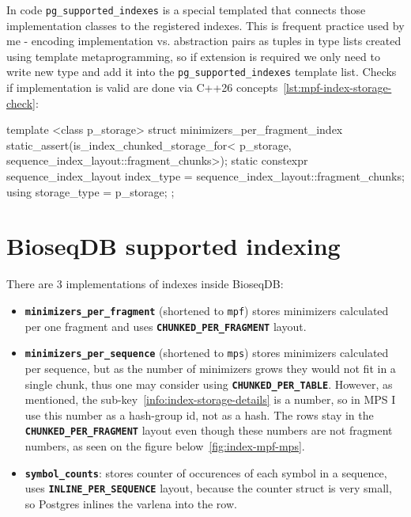 
In code \texttt{pg\_supported\_indexes} is a special templated that connects those implementation classes to the registered indexes. This is frequent practice used by me - encoding 
implementation vs. abstraction pairs as tuples in type lists created using template metaprogramming, so if extension is required we only need to write new type and add it into the 
\texttt{pg\_supported\_indexes} template list. Checks if implementation is valid are done via C++26 concepts~\ref{lst:mpf-index-storage-check}:

\begin{BioseqCppSnippet}[caption={Minimizers per fragment require fragment-chunk storage.},
  label={lst:mpf-index-storage-check}]
template <class p_storage>
struct minimizers_per_fragment_index {
  static_assert(is_index_chunked_storage_for<
      p_storage, sequence_index_layout::fragment_chunks>);
  static constexpr sequence_index_layout index_type =
      sequence_index_layout::fragment_chunks;
  using storage_type = p_storage;
};
\end{BioseqCppSnippet}

\section{BioseqDB supported indexing}
\label{sec:index-logical-layouts}

There are 3 implementations of indexes inside BioseqDB:
\begin{itemize}
  \item \textbf{\texttt{minimizers\_per\_fragment}} (shortened to \texttt{mpf}) stores minimizers calculated per one fragment and uses \textbf{\texttt{CHUNKED\_PER\_FRAGMENT}} layout.
  \item \textbf{\texttt{minimizers\_per\_sequence}} (shortened to \texttt{mps}) stores minimizers calculated per sequence, but as the number of minimizers grows
    they would not fit in a single chunk, thus one may consider using \textbf{\texttt{CHUNKED\_PER\_TABLE}}.
    However, as mentioned, the sub-key~\ref{info:index-storage-details} is a number, so in MPS I use this number as a hash-group id, not as a hash.
    The rows stay in the \textbf{\texttt{CHUNKED\_PER\_FRAGMENT}} layout even though
    these numbers are not fragment numbers, as seen on the figure below~\ref{fig:index-mpf-mps}.
  \item \textbf{\texttt{symbol\_counts}}: stores counter of occurences of each symbol in a sequence, uses \textbf{\texttt{INLINE\_PER\_SEQUENCE}} layout, because the counter struct is very small,
    so Postgres inlines the varlena into the row.
\label{lst:types-of-indexes-in-bioseqdb}
\end{itemize}




